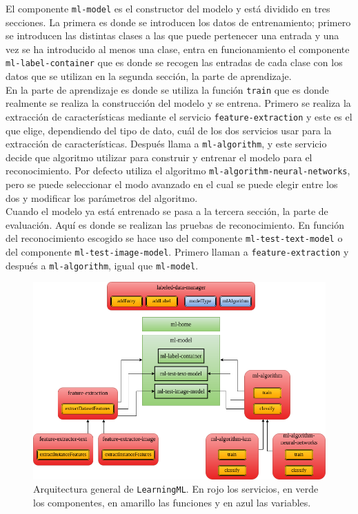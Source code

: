 \documentclass[a4paper, 12pt]{book}
\begin{document}
El componente \texttt{ml-model} es el constructor del modelo y está dividido en tres secciones. La primera es donde se introducen los datos de entrenamiento; primero se introducen las distintas clases a las que puede pertenecer una entrada y una vez se ha introducido al menos una clase, entra en funcionamiento el componente \texttt{ml-label-container} que es donde se recogen las entradas de cada clase con los datos que se utilizan en la segunda sección, la parte de aprendizaje. \\
En la parte de aprendizaje es donde se utiliza la función \texttt{train} que es donde realmente se realiza la construcción del modelo y se entrena. Primero se realiza la extracción de características mediante el servicio \texttt{feature-extraction} y este es el que elige, dependiendo del tipo de dato, cuál de los dos servicios usar para la extracción de características. 
Después llama a \texttt{ml-algorithm}, y este servicio decide que algoritmo utilizar para construir y entrenar el modelo para el reconocimiento. 
Por defecto utiliza el algoritmo \texttt{ml-algorithm-neural-networks}, pero se puede seleccionar el modo avanzado en el cual se puede elegir entre los dos y modificar los parámetros del algoritmo.\\
Cuando el modelo ya está entrenado se pasa a la tercera sección, la parte de evaluación. Aquí es donde se realizan las pruebas de reconocimiento. 
En función del reconocimiento escogido se hace uso del componente \texttt{ml-test-text-model} o del componente \texttt{ml-test-image-model}. 
Primero llaman a \texttt{feature-extraction} y después a \texttt{ml-algorithm}, igual que \texttt{ml-model}.

\begin{figure}
	\centering
	\includegraphics[width=13cm, keepaspectratio]{img/arquitectura.png}
	\caption{Arquitectura general de \texttt{LearningML}. En rojo los servicios, en verde los componentes, en amarillo las funciones y en azul las variables.} \label{fig:arquitectura}
\end{figure}
\end{document}
